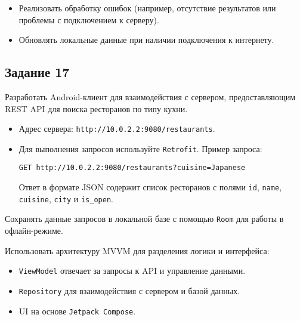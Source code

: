 \documentclass[a4paper,12pt]{article}
\begin{document}
\begin{itemize}
    \item Реализовать обработку ошибок (например, отсутствие результатов или проблемы с подключением к серверу).
    \item Обновлять локальные данные при наличии подключения к интернету.
\end{itemize}

\subsection*{Задание 17}

Разработать Android-клиент для взаимодействия с сервером, предоставляющим REST API для поиска ресторанов по типу кухни. 

\begin{itemize}
    \item Адрес сервера: \texttt{http://10.0.2.2:9080/restaurants}.
    \item Для выполнения запросов используйте \texttt{Retrofit}. Пример запроса:
\begin{verbatim}
GET http://10.0.2.2:9080/restaurants?cuisine=Japanese
\end{verbatim}
Ответ в формате JSON содержит список ресторанов с полями \texttt{id}, \texttt{name}, \texttt{cuisine}, \texttt{city} и \texttt{is\_open}.
\end{itemize}

Сохранять данные запросов в локальной базе с помощью \texttt{Room} для работы в офлайн-режиме.

Использовать архитектуру MVVM для разделения логики и интерфейса:
\begin{itemize}
    \item \texttt{ViewModel} отвечает за запросы к API и управление данными.
    \item \texttt{Repository} для взаимодействия с сервером и базой данных.
    \item UI на основе \texttt{Jetpack Compose}.
\end{itemize}
\end{document}
